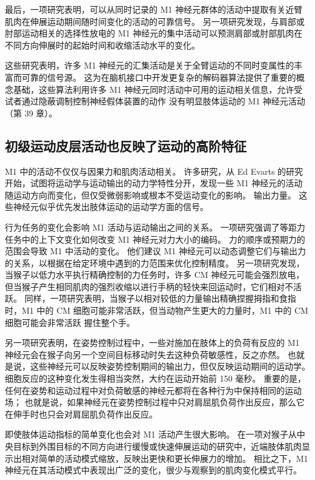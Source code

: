 最后，一项研究表明，可以从同时记录的 M1 神经元群体的活动中提取有关近臂肌肉在伸展运动期间随时间变化的活动的可靠信号。 另一项研究发现，与肩部或肘部运动相关的选择性放电的 M1 神经元的集中活动可以预测肩部或肘部肌肉在不同方向伸展时的起始时间和收缩活动水平的变化。

这些研究表明，许多 M1 神经元的汇集活动是关于全臂运动的不同时变属性的丰富而可靠的信号源。 这为在脑机接口中开发更复杂的解码器算法提供了重要的概念基础，这些算法利用许多 M1 神经元同时活动中可用的运动相关信息，允许受试者通过隐蔽调制控制神经假体装置的动作 没有明显肢体运动的 M1 神经元活动（第 39 章）。


\subsection{初级运动皮层活动也反映了运动的高阶特征}
M1 中的活动不仅仅与因果力和肌肉活动相关。 许多研究，从 Ed Evarts 的研究开始，试图将运动学与运动输出的动力学特性分开，发现一些 M1 神经元的活动随运动方向而变化，但仅受微弱影响或根本不受运动变化的影响。 输出力量。 这些神经元似乎优先发出肢体运动的运动学方面的信号。

行为任务的变化会影响 M1 活动与运动输出之间的关系。 一项研究强调了等距力任务中的上下文变化如何改变 M1 神经元对力大小的编码。 力的顺序或预期力的范围会导致 M1 中活动的变化。 他们建议 M1 神经元可以动态调整它们与输出力的关系，以根据在给定环境中遇到的力范围来优化控制精度。 另一项研究发现，当猴子以低力水平执行精确控制的力任务时，许多 CM 神经元可能会强烈放电，但当猴子产生相同肌肉的强烈收缩以进行手柄的轻快来回运动时，它们相对不活跃。 同样，一项研究表明，当猴子以相对较低的力量输出精确捏握拇指和食指时，M1 中的 CM 细胞可能非常活跃，但当动物产生更大的力量时，M1 中的 CM 细胞可能会非常活跃 握住整个手。

另一项研究表明，在姿势控制过程中，一些对施加在肢体上的负荷有反应的 M1 神经元会在猴子向另一个空间目标移动时失去这种负荷敏感性，反之亦然。 也就是说，这些神经元可以反映姿势控制期间的输出力，但仅反映运动期间的运动学。 细胞反应的这种变化发生得相当突然，大约在运动开始前 150 毫秒。 重要的是，任何在姿势和运动过程中对负荷敏感的神经元都将在各种行为中保持相同的运动场； 也就是说，如果神经元在姿势控制过程中只对肩屈肌负荷作出反应，那么它在伸手时也只会对肩屈肌负荷作出反应。

即使肢体运动指标的简单变化也会对 M1 活动产生很大影响。 在一项对猴子从中央目标到外围目标的不同方向进行缓慢或快速伸展运动的研究中，近端肢体肌肉显示出相对简单的活动模式缩放，反映出更快和更长伸展力的增加。 相比之下，M1 神经元在其活动模式中表现出广泛的变化，很少与观察到的肌肉变化模式平行。

